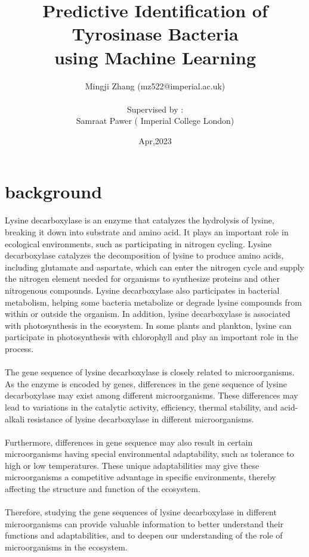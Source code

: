 \documentclass{article}
\title{Predictive Identification of Tyrosinase Bacteria\\
using Machine Learning}
\author{Mingji Zhang (mz522@imperial.ac.uk)\\\\
Supervised by :\\
Samraat Pawer ( Imperial College London)}
\date{Apr,2023}
\begin{document}
\maketitle
\newpage

\section{background}
 Lysine decarboxylase is an enzyme that catalyzes the hydrolysis of lysine, breaking it down into substrate and amino acid\citep{panis2021expression}. It plays an important role in ecological environments, such as participating in nitrogen cycling. Lysine decarboxylase catalyzes the decomposition of lysine to produce amino acids, including glutamate and aspartate, which can enter the nitrogen cycle and supply the nitrogen element needed for organisms to synthesize proteins and other nitrogenous compounds\citep{panis2021expression,}. Lysine decarboxylase also participates in bacterial metabolism, helping some bacteria metabolize or degrade lysine compounds from within or outside the organism. In addition, lysine decarboxylase is associated with photosynthesis in the ecosystem\citep{panis2022novel}. In some plants and plankton, lysine can participate in photosynthesis with chlorophyll and play an important role in the process.\\\\
The gene sequence of lysine decarboxylase is closely related to microorganisms. As the enzyme is encoded by genes, differences in the gene sequence of lysine decarboxylase may exist among different microorganisms. These differences may lead to variations in the catalytic activity, efficiency, thermal stability, and acid-alkali resistance of lysine decarboxylase in different microorganisms\citep{janusz2017lignin}.\\\\
Furthermore, differences in gene sequence may also result in certain microorganisms having special environmental adaptability, such as tolerance to high or low temperatures. These unique adaptabilities may give these microorganisms a competitive advantage in specific environments, thereby affecting the structure and function of the ecosystem\citep{panis2022novel}.\\\\
Therefore, studying the gene sequences of lysine decarboxylase in different microorganisms can provide valuable information to better understand their functions and adaptabilities, and to deepen our understanding of the role of microorganisms in the ecosystem.
\end{document}
